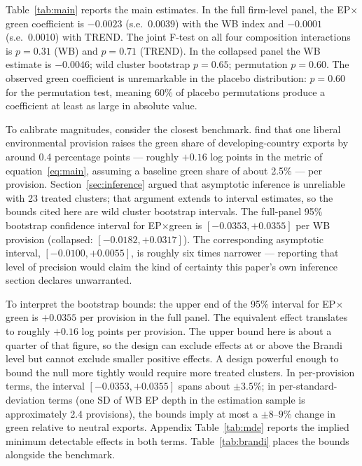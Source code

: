 \documentclass[12pt]{article}
\begin{document}
Table~\ref{tab:main} reports the main estimates. In the full firm-level panel, the
EP$\times$green coefficient is $-0.0023$ (s.e.\ 0.0039) with the WB index and $-0.0001$
(s.e.\ 0.0010) with TREND. The joint F-test on all four composition interactions is
$p = 0.31$ (WB) and $p = 0.71$ (TREND). In the collapsed panel the WB estimate is
$-0.0046$; wild cluster bootstrap $p = 0.65$; permutation $p = 0.60$. The observed
green coefficient is unremarkable in the placebo distribution: $p = 0.60$ for the permutation test, meaning 60\% of placebo permutations produce a coefficient at least as large in absolute value.

\begin{table}[htbp]
\centering
\caption{Triple-difference estimates: EP content and export composition}
\label{tab:main}

\end{table}

To calibrate magnitudes, consider the closest benchmark. \citet{brandi2020} find that one liberal
environmental provision raises the green share of developing-country exports by around
0.4 percentage points --- roughly $+0.16$ log points in the metric of
equation~\eqref{eq:main}, assuming a baseline green share of about 2.5\% --- per provision. Section~\ref{sec:inference} argued that
asymptotic inference is unreliable with 23 treated clusters; that argument extends to
interval estimates, so the bounds cited here are wild cluster bootstrap intervals. The
full-panel 95\% bootstrap confidence interval for EP$\times$green is $[-0.0353, +0.0355]$
per WB provision (collapsed: $[-0.0182, +0.0317]$). The corresponding asymptotic
interval, $[-0.0100, +0.0055]$, is roughly six times narrower --- reporting that level
of precision would claim the kind of certainty this paper's own inference section
declares unwarranted.

To interpret the bootstrap bounds: the upper end of the 95\% interval for EP$\times$green
is $+0.0355$ per provision in the full panel. The \citet{brandi2020} equivalent effect
translates to roughly $+0.16$ log points per provision. The upper bound here is about a
quarter of that figure, so the design can exclude effects at or above the Brandi level
but cannot exclude smaller positive effects. A design powerful enough to bound the null
more tightly would require more treated clusters. In per-provision terms, the interval
$[-0.0353, +0.0355]$ spans about $\pm 3.5$\%; in per-standard-deviation terms (one SD
of WB EP depth in the estimation sample is approximately 2.4 provisions), the bounds
imply at most a $\pm 8$--$9$\% change in green relative to neutral exports. Appendix Table~\ref{tab:mde} reports the implied minimum detectable effects in both terms. Table~\ref{tab:brandi} places the bounds alongside the \citet{brandi2020} benchmark.
\end{document}
